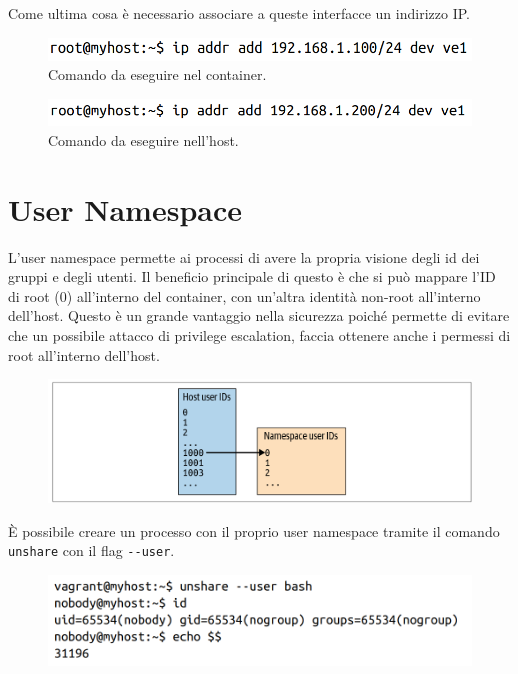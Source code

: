 Come ultima cosa è necessario associare a queste interfacce un indirizzo IP.

\begin{figure}[H]
    \centering
    \includegraphics[width=12cm, keepaspectratio]{capitoli/os_security/imgs/net7.png}
    \caption{Comando da eseguire nel container.}
\end{figure}

\begin{figure}[H]
    \centering
    \includegraphics[width=12cm, keepaspectratio]{capitoli/os_security/imgs/net8.png}
    \caption{Comando da eseguire nell'host.}
\end{figure}

\section{User Namespace}

L'user namespace permette ai processi di avere la propria visione degli id dei
gruppi e degli utenti. Il beneficio principale di questo è che si può mappare
l'ID di root (0) all'interno del container, con un'altra identità non-root
all'interno dell'host. Questo è un grande vantaggio nella sicurezza poiché
permette di evitare che un possibile attacco di privilege escalation, faccia ottenere
anche i permessi di root all'interno dell'host.

\begin{figure}[H]
    \centering
    \includegraphics[width=\textwidth, keepaspectratio]{capitoli/os_security/imgs/user1.png}
\end{figure}

È possibile creare un processo con il proprio user namespace tramite il comando
\verb|unshare| con il flag \verb|--user|.

\begin{figure}[H]
    \centering
    \includegraphics[width=\textwidth, keepaspectratio]{capitoli/os_security/imgs/user2.png}
\end{figure}

